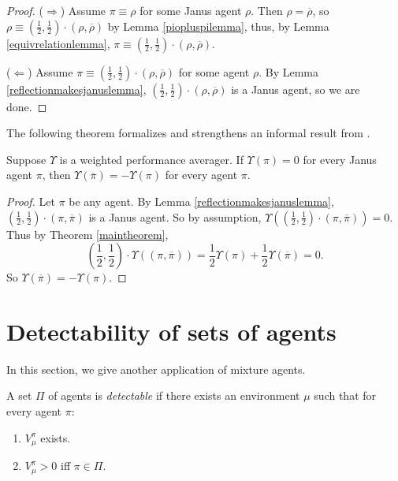 \documentclass[runningheads]{llncs}
\begin{document}
\begin{proof}
    ($\Rightarrow$)
    Assume $\pi\equiv\rho$ for some Janus agent $\rho$.
    Then $\rho=\overline{\rho}$, so
    $\rho\equiv (\frac12,\frac12)\cdot(\rho,\overline{\rho})$ by
    Lemma \ref{piopluspilemma}, thus, by Lemma \ref{equivrelationlemma},
    $\pi\equiv(\frac12,\frac12)\cdot(\rho,\overline{\rho})$.

    ($\Leftarrow$)
    Assume $\pi\equiv(\frac12,\frac12)\cdot(\rho,\overline{\rho})$ for some agent $\rho$.
    By Lemma \ref{reflectionmakesjanuslemma},
    $(\frac12,\frac12)\cdot(\rho,\overline{\rho})$ is a Janus agent, so we are done.
\end{proof}

The following theorem formalizes and strengthens an informal result
from \cite{alexander2021reward}.

\begin{theorem}
    Suppose $\Upsilon$ is a weighted performance averager.
    If $\Upsilon(\pi)=0$ for every Janus agent $\pi$,
    then $\Upsilon(\overline{\pi})=-\Upsilon(\pi)$
    for every agent $\pi$.
\end{theorem}

\begin{proof}
    Let $\pi$ be any agent.
    By Lemma \ref{reflectionmakesjanuslemma},
    $(\frac12,\frac12)\cdot(\pi,\overline\pi)$ is a Janus agent.
    So by assumption,
    $\Upsilon((\frac12,\frac12)\cdot(\pi,\overline\pi))=0$.
    Thus by Theorem \ref{maintheorem},
    \[
        (\mbox{$\frac12$},\mbox{$\frac12$})\cdot\Upsilon((\pi,\overline\pi))
        =\mbox{$\frac12$}\Upsilon(\pi)+\mbox{$\frac12$}\Upsilon(\overline\pi)=0.
    \]
    So $\Upsilon(\overline{\pi})=-\Upsilon(\pi)$.
\end{proof}


\section{Detectability of sets of agents}

In this section, we give another application of mixture agents.

\begin{definition}
\label{incentivizabilitydefn}
    A set $\Pi$ of agents is \emph{detectable} if there exists
    an environment $\mu$ such that for every agent $\pi$:
    \begin{enumerate}
        \item
        $V^\pi_\mu$ exists.
        \item
        $V^\pi_\mu>0$ iff $\pi\in\Pi$.
    \end{enumerate}
\end{definition}
\end{document}
